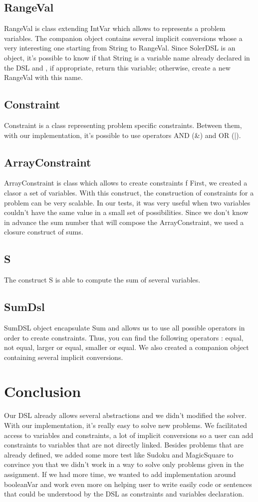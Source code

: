 \subsection{RangeVal}
RangeVal is class extending IntVar which allows to represents a problem variables. The companion object contains several implicit conversions whose a very interesting one starting from String to RangeVal. Since SolerDSL is an object, it's possible to know if that String is a variable name already declared in the DSL and , if appropriate, return this variable; otherwise, create a new RangeVal with this name.\\
\subsection{Constraint}
Constraint is a class representing problem specific constraints. Between them, with our implementation, it's possible to use operators AND (\&) and OR (|).\\
\subsection{ArrayConstraint}
ArrayConstraint is class which allows to create constraints f
First, we created a clasor a set of variables. With this construct, the construction of constraints for a problem can be very scalable. In our tests, it was very useful when two variables couldn't have the same value in a small set of possibilities. Since we don't know in advance the sum number that will compose the ArrayConstraint, we used a closure construct of sums.
\subsection{S}
The construct S is able to compute the sum of several variables.
\subsection{SumDsl}
SumDSL object encapsulate Sum and allows us to use all possible operators in order to create constraints. Thus, you can find the following operators : equal, not equal, larger or equal, smaller or equal. We also created a companion object containing several implicit conversions.
\section{Conclusion} 
Our DSL already allows several abstractions and we didn't modified the solver. With our implementation, it's really easy to solve new problems. We facilitated access to variables and constraints, a lot of implicit conversions so a user can add constraints to variables that are not directly linked. Besides problems that are already defined, we added some more test like Sudoku and MagicSquare to convince you that we didn't work in a way to solve only problems given in the assignment. If we had more time, we wanted to add implementation around booleanVar and work even more on helping user to write easily code or sentences that could be understood by the DSL as constraints and variables declaration. 


